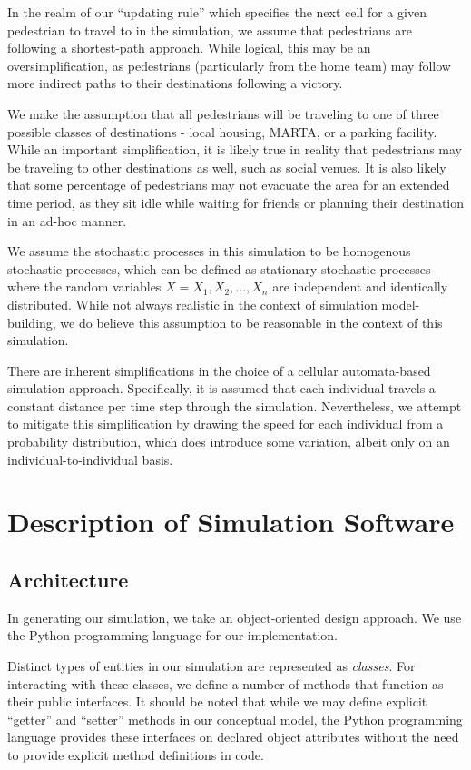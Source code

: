 \documentclass[12pt]{article}
\begin{document}
In the realm of our ``updating rule'' which specifies the next cell for a given
pedestrian to travel to in the simulation, we assume that pedestrians are
following a shortest-path approach. While logical, this may be an
oversimplification, as pedestrians (particularly from the home team) may follow
more indirect paths to their destinations following a victory.

We make the assumption that all pedestrians will be traveling to one of three
possible classes of destinations - local housing, MARTA, or a parking facility.
While an important simplification, it is likely true in reality that pedestrians
may be traveling to other destinations as well, such as social venues. It is
also likely that some percentage of pedestrians may not evacuate the area for
an extended time period, as they sit idle while waiting for friends or planning
their destination in an ad-hoc manner.

We assume the stochastic processes in this simulation to be homogenous
stochastic processes, which can be defined as stationary stochastic processes
where the random variables $X = X_1, X_2, ..., X_n$ are independent and
identically distributed. While not always realistic in the context of
simulation model-building, we do believe this assumption to be reasonable in
the context of this simulation.

There are inherent simplifications in the choice of a cellular automata-based
simulation approach. Specifically, it is assumed that each individual travels
a constant distance per time step through the simulation. Nevertheless, we
attempt to mitigate this simplification by drawing the speed for each
individual from a probability distribution, which does introduce some
variation, albeit only on an individual-to-individual basis.

\section{Description of Simulation Software}

\subsection{Architecture}
In generating our simulation, we take an object-oriented design approach. We use
the Python programming language for our implementation.

Distinct types of entities in our simulation are represented as
\textit{classes}. For interacting with these classes, we define a number of
methods that function as their public interfaces. It should be noted that while
we may define explicit ``getter'' and ``setter'' methods in our conceptual model,
the Python programming language provides these interfaces on declared object
attributes without the need to provide explicit method definitions in code.
\end{document}
